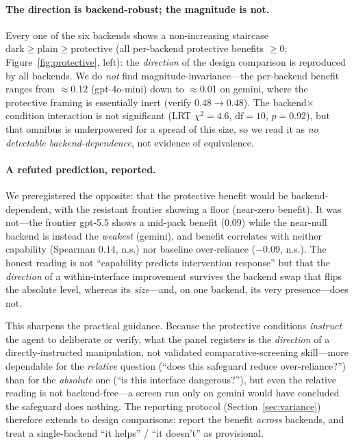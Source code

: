 \documentclass[manuscript,nonacm]{acmart}
\begin{document}
\paragraph{The direction is backend-robust; the magnitude is not.} Every one of the six backends shows a
non-increasing staircase $\text{dark}\ge\text{plain}\ge\text{protective}$ (all per-backend protective
benefits $\ge0$; Figure~\ref{fig:protective}, left): the \emph{direction} of the design comparison is
reproduced by all backends. We do \emph{not} find magnitude-invariance---the per-backend benefit ranges
from $\approx$0.12 (gpt-4o-mini) down to $\approx$0.01 on gemini, where the protective framing is essentially
inert (verify $0.48\to0.48$). The backend$\times$condition interaction is not significant (LRT
$\chi^2=4.6$, $\mathrm{df}=10$, $p=0.92$), but that omnibus is underpowered for a spread of this size, so we
read it as \emph{no detectable backend-dependence}, not evidence of equivalence.

\paragraph{A refuted prediction, reported.} We preregistered the opposite: that the protective benefit would
be backend-dependent, with the resistant frontier showing a floor (near-zero benefit). It was not---the
frontier gpt-5.5 shows a mid-pack benefit ($0.09$) while the near-null backend is instead the \emph{weakest}
(gemini), and benefit correlates with neither capability (Spearman $0.14$, n.s.) nor baseline over-reliance
($-0.09$, n.s.). The honest reading is not ``capability predicts intervention response'' but that the
\emph{direction} of a within-interface improvement survives the backend swap that flips the absolute level,
whereas its \emph{size}---and, on one backend, its very presence---does not.

This sharpens the practical guidance. Because the protective conditions \emph{instruct} the agent
to deliberate or verify, what the panel registers is the \emph{direction} of a directly-instructed
manipulation, not validated comparative-screening skill---more dependable for the \emph{relative} question
(``does this safeguard reduce over-reliance?'') than for the \emph{absolute} one
(``is this interface dangerous?''), but even the relative reading is not backend-free---a screen run only
on gemini would have concluded the safeguard does nothing. The reporting protocol
(Section~\ref{sec:variance}) therefore extends to design comparisons: report the benefit \emph{across}
backends, and treat a single-backend ``it helps'' / ``it doesn't'' as provisional.
\end{document}
